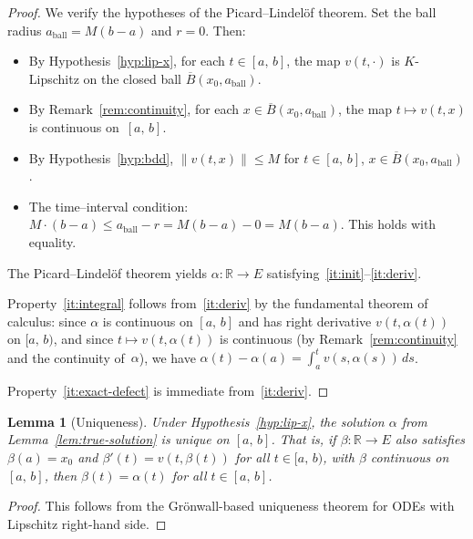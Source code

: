 \documentclass[11pt,a4paper]{article}
\newtheorem{lemma}[theorem]{Lemma}
\theoremstyle{definition}
\newcommand{\norm}[1]{\lVert #1 \rVert}
\newcommand{\R}{\mathbb{R}}
\newcommand{\Icc}[2]{[#1,\, #2]}
\newcommand{\Ico}[2]{[#1,\, #2)}
\begin{document}
\begin{proof}
We verify the hypotheses of the Picard--Lindel\"of theorem.
Set the ball radius $a_{\mathrm{ball}} = M(b - a)$ and $r = 0$.
Then:
\begin{itemize}
  \item By Hypothesis~\ref{hyp:lip-x}, for each
    $t \in \Icc{a}{b}$, the map $v(t, \cdot)$ is $K$-Lipschitz on
    the closed ball $\overline{B}(x_0, a_{\mathrm{ball}})$.
  \item By Remark~\ref{rem:continuity}, for each
    $x \in \overline{B}(x_0, a_{\mathrm{ball}})$, the map
    $t \mapsto v(t, x)$ is continuous on~$\Icc{a}{b}$.
  \item By Hypothesis~\ref{hyp:bdd},
    $\norm{v(t, x)} \le M$ for $t \in \Icc{a}{b}$,
    $x \in \overline{B}(x_0, a_{\mathrm{ball}})$.
  \item The time--interval condition:
    $M \cdot (b - a) \le a_{\mathrm{ball}} - r = M(b - a) - 0 = M(b - a)$.
    This holds with equality.
\end{itemize}
The Picard--Lindel\"of theorem yields
$\alpha \colon \R \to E$ satisfying~\ref{it:init}--\ref{it:deriv}.

Property~\ref{it:integral} follows from~\ref{it:deriv} by the
fundamental theorem of calculus: since $\alpha$ is continuous on
$\Icc{a}{b}$ and has right derivative $v(t, \alpha(t))$ on
$\Ico{a}{b}$, and since $t \mapsto v(t, \alpha(t))$ is continuous
(by Remark~\ref{rem:continuity} and the continuity of~$\alpha$),
we have $\alpha(t) - \alpha(a) = \int_a^t v(s, \alpha(s))\,ds$.

Property~\ref{it:exact-defect} is immediate from~\ref{it:deriv}.
\end{proof}


\begin{lemma}[Uniqueness]\label{lem:uniqueness}
Under Hypothesis~\ref{hyp:lip-x}, the solution $\alpha$ from
Lemma~\ref{lem:true-solution} is unique on $\Icc{a}{b}$.
That is, if $\beta \colon \R \to E$ also satisfies $\beta(a) = x_0$
and $\beta'(t) = v(t, \beta(t))$ for all $t \in \Ico{a}{b}$,
with $\beta$ continuous on $\Icc{a}{b}$, then
$\beta(t) = \alpha(t)$ for all $t \in \Icc{a}{b}$.
\end{lemma}

\begin{proof}
This follows from the Gr\"onwall-based uniqueness theorem
for ODEs with Lipschitz right-hand side.
\end{proof}


\end{document}
